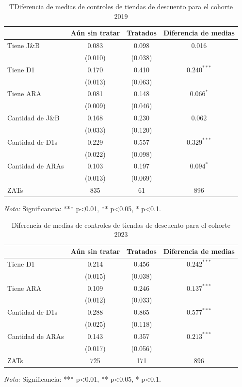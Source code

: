 \documentclass{article}
\begin{document}
\begin{table} [H]
  \centering
  \caption{TDiferencia de medias de controles de tiendas de descuento para el cohorte 2019}
  \label{tab:d1_jb_ara}
  \begin{tabular}{l c c c}
    \toprule
    & \textbf{Aún sin tratar} & \textbf{Tratados} & \textbf{Diferencia de medias} \\
    \midrule
    Tiene J\&B & 0.083 & 0.098 & 0.016 \\
    & (0.010) & (0.038) & \\
    Tiene D1 & 0.170 & 0.410 & $0.240^{***}$ \\
    & (0.013) & (0.063) & \\
    Tiene ARA & 0.081 & 0.148 & $0.066^{*}$ \\
    & (0.009) & (0.046) & \\
    Cantidad de J\&B & 0.168 & 0.230 & 0.062 \\
    & (0.033) & (0.120) & \\
    Cantidad de D1s & 0.229 & 0.557 & $0.329^{***}$ \\
    & (0.022) & (0.098) & \\
    Cantidad de ARAs & 0.103 & 0.197 & $0.094^{*}$ \\
    & (0.013) & (0.069) & \\
    \midrule
    ZATs & 835 & 61 & 896 \\
    \bottomrule
  \end{tabular}
  \parbox[t]{\textwidth}{%
    \vspace{0.5em}
    \footnotesize{ \textit{Nota:} Significancia: *** p<0.01, ** p<0.05, * p<0.1.}}
\end{table}

\begin{table} [H]
  \centering
  \caption{Diferencia de medias de controles de tiendas de descuento para el cohorte 2023}
  \label{tab:d1_ara_2023}
  \begin{tabular}{l c c c}
    \toprule
    & \textbf{Aún sin tratar} & \textbf{Tratados} & \textbf{Diferencia de medias} \\
    \midrule
    Tiene D1 & 0.214 & 0.456 & $0.242^{***}$ \\
    & (0.015) & (0.038) & \\
    Tiene ARA & 0.109 & 0.246 & $0.137^{***}$ \\
    & (0.012) & (0.033) & \\
    Cantidad de D1s & 0.288 & 0.865 & $0.577^{***}$ \\
    & (0.025) & (0.118) & \\
    Cantidad de ARAs & 0.143 & 0.357 & $0.213^{***}$ \\
    & (0.017) & (0.056) & \\
    \midrule
    ZATs & 725 & 171 & 896 \\
    \bottomrule
  \end{tabular}
  \parbox[t]{\textwidth}{%
    \vspace{0.5em}
    \footnotesize{ \textit{Nota:} Significancia: *** p<0.01, ** p<0.05, * p<0.1.}}
\end{table}
\end{document}
